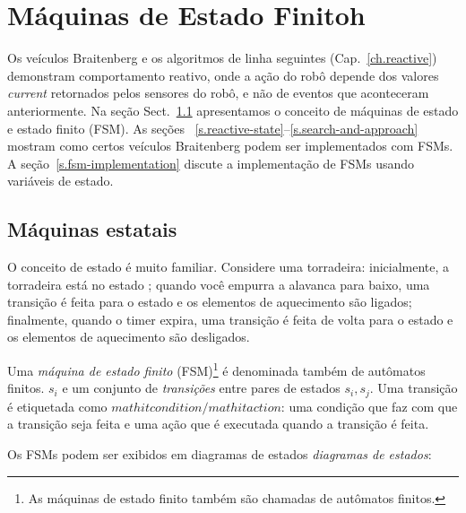 
\chapter{Máquinas de Estado Finitoh}\label{ch.fmg}

Os veículos Braitenberg e os algoritmos de linha seguintes (Cap.~\ref{ch.reactive}) demonstram comportamento reativo, onde a ação do robô depende dos valores \emph{current} retornados pelos sensores do robô, e não de eventos que aconteceram anteriormente. Na seção Sect.~\ref{s.sm} apresentamos o conceito de máquinas de estado e estado finito (FSM). As seções ~\ref{s.reactive-state}--\ref{s.search-and-approach} mostram como certos veículos Braitenberg podem ser implementados com FSMs. A seção~\ref{s.fsm-implementation} discute a implementação de FSMs usando variáveis de estado.

\section{Máquinas estatais}\label{s.sm}

O conceito de estado é muito familiar. Considere uma torradeira: inicialmente, a torradeira está no estado ; quando você empurra a alavanca para baixo, uma transição é feita para o estado  e os elementos de aquecimento são ligados; finalmente, quando o timer expira, uma transição é feita de volta para o estado  e os elementos de aquecimento são desligados.

Uma \emph{máquina de estado finito} (FSM)\footnote{As máquinas de estado finito também são chamadas de autômatos finitos.} é denominada também de autômatos finitos. $s_i$ e um conjunto de \emph{transições} entre pares de estados $s_i, s_j$. Uma transição é etiquetada como $mathit{condition}/mathit{action}$: uma condição que faz com que a transição seja feita e uma ação que é executada quando a transição é feita.

Os FSMs podem ser exibidos em diagramas de estados \emph{diagramas de estados}:
\begin{center}
\end{center}


